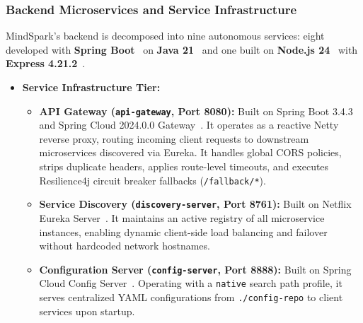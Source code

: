 \subsubsection{Backend Microservices and Service Infrastructure}
MindSpark's backend is decomposed into nine autonomous services: eight developed with \textbf{Spring Boot}~\cite{springboot2026} on \textbf{Java 21}~\cite{java2026} and one built on \textbf{Node.js 24}~\cite{nodejs2026} with \textbf{Express 4.21.2}~\cite{express2026}.

\begin{itemize}[leftmargin=1.5em]
    \item \textbf{Service Infrastructure Tier:}
    \begin{itemize}[leftmargin=1.2em]
        \item \textbf{API Gateway (\texttt{api-gateway}, Port 8080):} Built on Spring Boot 3.4.3 and Spring Cloud 2024.0.0 Gateway~\cite{springcloud2026}. It operates as a reactive Netty reverse proxy, routing incoming client requests to downstream microservices discovered via Eureka. It handles global CORS policies, strips duplicate headers, applies route-level timeouts, and executes Resilience4j circuit breaker fallbacks (\texttt{/fallback/*}).
        \item \textbf{Service Discovery (\texttt{discovery-server}, Port 8761):} Built on Netflix Eureka Server~\cite{eureka2026}. It maintains an active registry of all microservice instances, enabling dynamic client-side load balancing and failover without hardcoded network hostnames.
        \item \textbf{Configuration Server (\texttt{config-server}, Port 8888):} Built on Spring Cloud Config Server~\cite{springcloud2026}. Operating with a \texttt{native} search path profile, it serves centralized YAML configurations from \texttt{./config-repo} to client services upon startup.
    \end{itemize}
    

\end{itemize}
